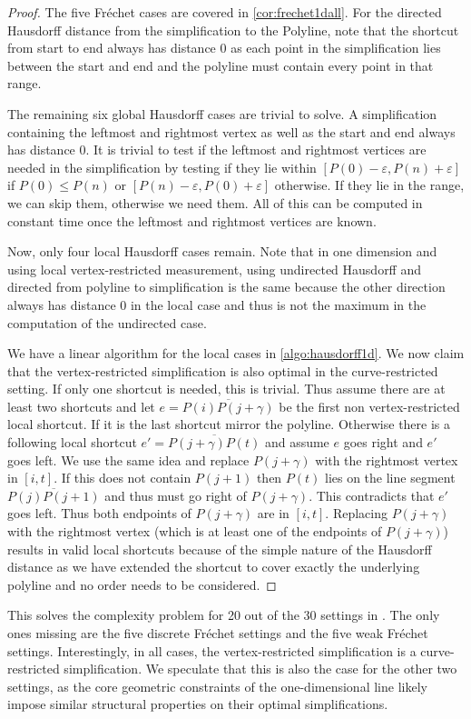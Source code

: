 \begin{proof}
	The five Fréchet cases are covered in \cref{cor:frechet1dall}. For the directed Hausdorff distance from the simplification to the Polyline, note that the shortcut from start to end always has distance 0 as each point in the simplification lies between the start and end and the polyline must contain every point in that range. 

	The remaining six global Hausdorff cases are trivial to solve. A simplification containing the leftmost and rightmost vertex as well as the start and end always has distance 0. It is trivial to test if the leftmost and rightmost vertices are needed in the simplification by testing if they lie within \([P(0) - \varepsilon, P(n) + \varepsilon]\) if \(P(0) \leq P(n)\) or \([P(n) - \varepsilon, P(0) + \varepsilon]\) otherwise. If they lie in the range, we can skip them, otherwise we need them. All of this can be computed in constant time once the leftmost and rightmost vertices are known.

	Now, only four local Hausdorff cases remain. Note that in one dimension and using local vertex-restricted measurement, using undirected Hausdorff and directed from polyline to simplification is the same because the other direction always has distance 0 in the local case and thus is not the maximum in the computation of the undirected case. 

	We have a linear algorithm for the local cases in \cref{algo:hausdorff1d}. We now claim that the vertex-restricted simplification is also optimal in the curve-restricted setting. If only one shortcut is needed, this is trivial. Thus assume there are at least two shortcuts and let \(e = \overline{P(i)P(j+\gamma)}\) be the first non vertex-restricted local shortcut. If it is the last shortcut mirror the polyline. Otherwise there is a following local shortcut \(e' = \overline{P(j+\gamma)P(t)}\) and assume \(e\) goes right and \(e'\) goes left. We use the same idea and replace \(P(j+\gamma)\) with the rightmost vertex in \([i, t]\). If this does not contain \(P(j+1)\) then \(P(t)\) lies on the line segment \(\overline{P(j)P(j+1)}\) and thus must go right of \(P(j+\gamma)\). This contradicts that \(e'\) goes left. Thus both endpoints of \(P(j+\gamma)\) are in \([i, t]\). Replacing \(P(j+\gamma)\) with the rightmost vertex (which is at least one of the endpoints of \(P(j+\gamma)\)) results in valid local shortcuts because of the simple nature of the Hausdorff distance as we have extended the shortcut to cover exactly the underlying polyline and no order needs to be considered.
\end{proof}

This solves the complexity problem for 20 out of the 30 settings in \citeauthor{global_curve_simplification}. The only ones missing are the five discrete Fréchet settings and the five weak Fréchet settings. Interestingly, in all cases, the vertex-restricted simplification is a curve-restricted simplification. We speculate that this is also the case for the other two settings, as the core geometric constraints of the one-dimensional line likely impose similar structural properties on their optimal simplifications.
